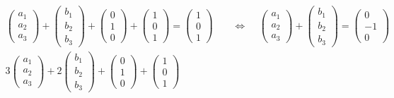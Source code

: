 \documentclass{article}
\begin{document}
        \begin{align}
            \left(\begin{matrix} a_1\\a_2\\a_3 \end{matrix}\right) + \left(\begin{matrix} b_1\\b_2\\b_3 \end{matrix}\right) 
                + \left(\begin{matrix} 0\\1\\0 \end{matrix}\right) + \left(\begin{matrix} 1\\0\\1 \end{matrix}\right)
                = \left(\begin{matrix} 1\\0\\1 \end{matrix}\right)\ \ \ \ \ 
            &\Leftrightarrow\ \ \ \ \  \left(\begin{matrix} a_1\\a_2\\a_3 \end{matrix}\right) + \left(\begin{matrix} b_1\\b_2\\b_3 \end{matrix}\right)
                = \left(\begin{matrix} 0\\-1\\0 \end{matrix}\right)\\
            3 \left(\begin{matrix} a_1\\a_2\\a_3 \end{matrix}\right) + 2 \left(\begin{matrix} b_1\\b_2\\b_3 \end{matrix}\right)
                + \left(\begin{matrix} 0\\1\\0 \end{matrix}\right) + \left(\begin{matrix} 1\\0\\1 \end{matrix}\right)

\end{align}
\end{document}
